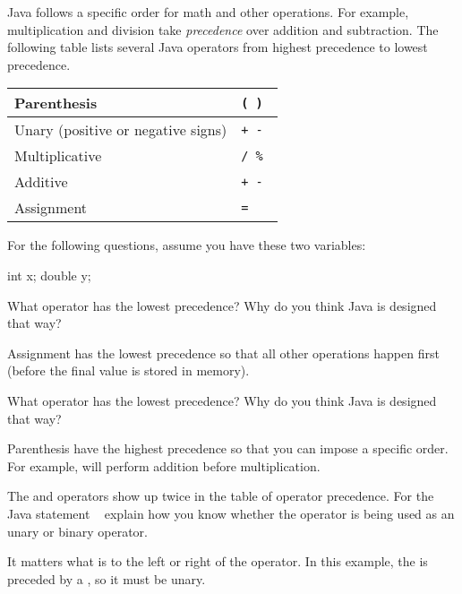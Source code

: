 

Java follows a specific order for math and other operations. For example, multiplication and division take \emph{precedence} over addition and subtraction.
The following table lists several Java operators from highest precedence to lowest precedence.

\begin{center}
\begin{tabular}{|L{3in}|L{1in}|}
\hline
Parenthesis
& \tt ( ) \\
\hline
Unary (positive or negative signs)
& \tt + - \\
\hline
Multiplicative
& \tt * / \% \\
\hline
Additive
& \tt + - \\
\hline
Assignment
& \tt = \\
\hline
\end{tabular}
\end{center}

For the following questions, assume you have these two variables:

\begin{javalst}
    int x;
    double y;
\end{javalst}




\Q What operator has the lowest precedence?
Why do you think Java is designed that way?

\begin{answer}
Assignment has the lowest precedence so that all other operations happen first (before the final value is stored in memory).
\end{answer}


\Q What operator has the lowest precedence?
Why do you think Java is designed that way?

\begin{answer}
Parenthesis have the highest precedence so that you can impose a specific order.
For example,  will perform addition before multiplication.
\end{answer}


\Q The \java{+} and \java{-} operators show up twice in the table of operator precedence.
For the Java statement ~ explain how you know whether the \java{-} operator is being used as an unary or binary operator.

\begin{answer}
It matters what is to the left or right of the operator.
In this example, the \java{-} is preceded by a \java{*}, so it must be unary.
\end{answer}


